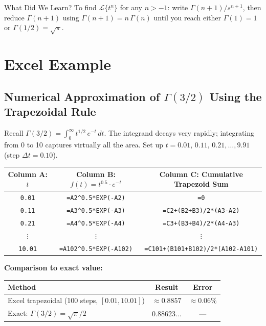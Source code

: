 \documentclass[12pt,a4paper]{article}
\begin{document}
\begin{learnbox}{What Did We Learn?}
To find $\mathcal{L}\{t^n\}$ for any $n > -1$: write
$\Gamma(n+1)/s^{n+1}$, then reduce $\Gamma(n+1)$ using
$\Gamma(n+1) = n\,\Gamma(n)$ until you reach either $\Gamma(1) = 1$ or
$\Gamma(1/2) = \sqrt{\pi}$.
\end{learnbox}

\section{Excel Example }

\subsection*{Numerical Approximation of $\Gamma(3/2)$ Using the Trapezoidal Rule}

Recall $\Gamma(3/2) = \int_0^{\infty} t^{1/2}\,e^{-t}\,dt$.
The integrand decays very rapidly; integrating from 0 to 10 captures virtually
all the area.  Set up $t = 0.01,\, 0.11,\, 0.21, \ldots, 9.91$ (step
$\Delta t = 0.10$).

\medskip
\begin{center}
\begin{tabular}{ccc}
\toprule
Column A: $t$ & Column B: $f(t) = t^{0.5}\cdot e^{-t}$
  & Column C: Cumulative Trapezoid Sum \\
\midrule
\texttt{0.01} & \texttt{=A2\^{}0.5*EXP(-A2)} & \texttt{=0} \\
\texttt{0.11} & \texttt{=A3\^{}0.5*EXP(-A3)} &
  \texttt{=C2+(B2+B3)/2*(A3-A2)} \\
\texttt{0.21} & \texttt{=A4\^{}0.5*EXP(-A4)} &
  \texttt{=C3+(B3+B4)/2*(A4-A3)} \\
$\vdots$ & $\vdots$ & $\vdots$ \\
\texttt{10.01} & \texttt{=A102\^{}0.5*EXP(-A102)} &
  \texttt{=C101+(B101+B102)/2*(A102-A101)} \\
\bottomrule
\end{tabular}
\end{center}

\medskip
\textbf{Comparison to exact value:}

\begin{center}
\begin{tabular}{lcc}
\toprule
Method & Result & Error \\
\midrule
Excel trapezoidal (100 steps, $[0.01, 10.01]$) & $\approx 0.8857$ & $\approx 0.06\%$ \\
Exact: $\Gamma(3/2) = \sqrt{\pi}/2$ & $0.88623\ldots$ & --- \\
\bottomrule
\end{tabular}
\end{center}
\end{document}
